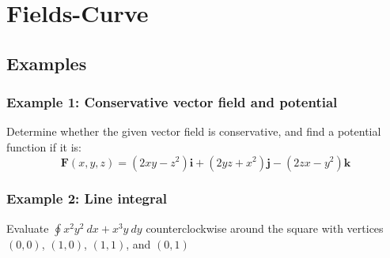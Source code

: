 \section{Fields-Curve}
\subsection{Examples}
\subsubsection{Example 1: Conservative vector field and potential}
Determine whether the given vector field is conservative, and find a potential
function if it is:
$$\mathbf{F}(x,y,z)=( 2x y-z^{2})\mathbf{i}+( 2y z+ x^{2})\mathbf{j}-(2z x- y^{2})\mathbf{k}$$
\subsubsection{Example 2: Line integral}
Evaluate $\oint x^2y^2 \ dx + x^3y\ dy$ counterclockwise around the square with vertices
$(0,0)$, $(1,0)$, $(1, 1)$, and $(0, 1)$
